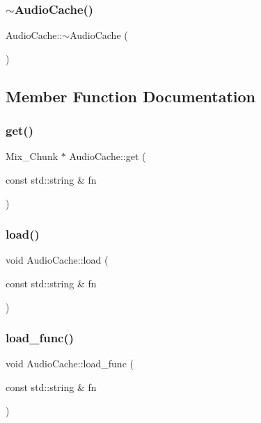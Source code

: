 \subsubsection{\texorpdfstring{$\sim$AudioCache()}{~AudioCache()}}
{\footnotesize\ttfamily Audio\+Cache\+::$\sim$\+Audio\+Cache (\begin{DoxyParamCaption}{ }\end{DoxyParamCaption})}



\subsection{Member Function Documentation}
\mbox{\label{classsage_1_1AudioCache_a2a9ba507b403201dfb9d5d7b85160cb4}} 
\subsubsection{\texorpdfstring{get()}{get()}}
{\footnotesize\ttfamily Mix\+\_\+\+Chunk $\ast$ Audio\+Cache\+::get (\begin{DoxyParamCaption}\item[{const std\+::string \&}]{fn }\end{DoxyParamCaption})}

\mbox{\label{classsage_1_1AudioCache_aafae5e1d8e31d8beac67b1326f59712a}} 
\subsubsection{\texorpdfstring{load()}{load()}}
{\footnotesize\ttfamily void Audio\+Cache\+::load (\begin{DoxyParamCaption}\item[{const std\+::string \&}]{fn }\end{DoxyParamCaption})}

\mbox{\label{classsage_1_1AudioCache_a06400f89de15e5db96b8f0cbd27c71e3}} 
\subsubsection{\texorpdfstring{load\_func()}{load\_func()}}
{\footnotesize\ttfamily void Audio\+Cache\+::load\+\_\+func (\begin{DoxyParamCaption}\item[{const std\+::string \&}]{fn }\end{DoxyParamCaption})\hspace{0.3cm}{\ttfamily [private]}}


